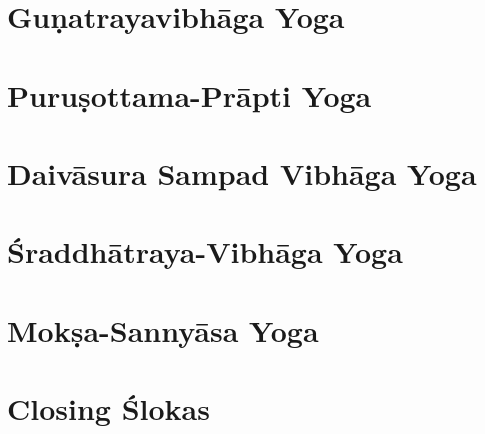 \documentclass[headings=small]{scrbook}
\begin{document}
\chapter{Guṇatrayavibhāga Yoga}
\begin{multicols}{2}
    
\end{multicols}

\chapter{Puruṣottama-Prāpti Yoga}
\begin{multicols}{2}
    
\end{multicols}

\chapter{Daivāsura Sampad Vibhāga Yoga}
\begin{multicols}{2}
    
\end{multicols}

\chapter{Śraddhātraya-Vibhāga Yoga}
\begin{multicols}{2}
    
\end{multicols}

\chapter{Mokṣa-Sannyāsa Yoga}
\begin{multicols}{2}
    
\end{multicols}

\backmatter
\chapter{Closing Ślokas}

\end{document}
